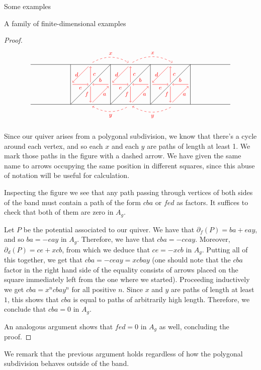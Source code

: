 \begin{chapter}{Some examples}
\begin{section}{A family of finite-dimensional examples}
\begin{proof}
\[
\begin{tikzpicture}[text width=1.5mm, font=\footnotesize]
\draw (-5, 0) -- (5, 0);
\draw (-5, 2) -- (5, 2);
\foreach \x in {-3,-1,...,3}
\draw (\x, 0) -- (\x, 2);
\foreach \x in {-3,-1,1}
{
\draw (\x,0) -- (\x+2, 2);
\draw [->, red] (\x+1.9, 1) to node[above] {$b$} (\x+1.1, 1);
\draw[->, red] (\x+1, 0.9) to node[left]{$f$} (\x+1, 0.1);
\draw[->, red] (\x+1.1, 0.1) to node[right]{$a$} (\x+1.9, 0.9);
\draw[->, red] (\x+1, 1.1) to node[right]{$c$} (\x+1, 1.9);
\draw[->, red] (\x+0.9, 1.9) to node[left]{$d$} (\x+0.1, 1.1);
\draw[->, red] (\x+0.1, 1) to node[below]{$e$} (\x+0.9, 1);
}

\draw[->, red, dashed] (-1.9, 2.1) to [bend left] node[above]{$x$} (-0.1, 2.1);
\draw[->, red, dashed] (0.1, 2.1) to [bend left] node[above]{$x$} (2.1, 2.1);
\draw[<-, red, dashed] (-1.9, -0.1) to [bend right] node[below]{$y$} (-0.1, -0.1);
\draw[<-, red, dashed] (0.1, -0.1) to [bend right] node[below]{$y$} (2.1, -0.1);
\end{tikzpicture}
\]

Since our quiver arises from a polygonal subdivision, we know that there's a cycle around each vertex, and so each $x$ and each $y$ are paths of length at least 1. We mark those paths in the figure with a dashed arrow. We have given the same name to arrows occupying the same position in different squares, since this abuse of notation will be useful for calculation.

Inspecting the figure we see that any path passing through vertices of both sides of the band must contain a path of the form $cba$ or $fed$ as factors. It suffices to check that both of them are zero in $A_g$.

Let $P$ be the potential associated to our quiver. We have that $\partial_f(P) = ba + eay$, and so $ba  = -eay$ in $A_g$. Therefore, we have that $cba = -ceay$. Moreover, $\partial_d(P) = ce + xcb$, from which we deduce that $ce = -xcb$ in $A_g$. Putting all of this together, we get that $cba=-ceay=xcbay$ (one should note that the $cba$ factor in the right hand side of the equality consists of arrows placed on the square immediately left from the one where we started). Proceeding inductively we get $cba=x^ncbay^n$ for all positive $n$. Since $x$ and $y$ are paths of length at least $1$, this shows that $cba$ is equal to paths of arbitrarily high length. Therefore, we conclude that $cba=0$ in $A_g$. 

An analogous argument shows that $fed=0$ in $A_g$ as well, concluding the proof. 
\end{proof}
We remark that the previous argument holds regardless of how the polygonal subdivision behaves outside of the band.


\end{section}
\end{chapter}
